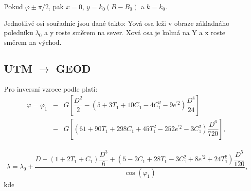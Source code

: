 \documentclass[11pt,a4paper]{article}
\begin{document}
Pokud $\varphi \pm \pi/2$, pak $x=0$, $y = k_{0}\left(B-B_{0}\right)$ a $k=k_{0}$.

Jednotlivé osi souřadníc jsou dané takto: Yová osa leži v obraze základnáho poledníku $\lambda_{0}$ a y roste směrem na sever. Xová osa je kolmá na Y a x roste směrem na východ. 

\subsection{UTM $\rightarrow$ GEOD}

Pro inversní vzroce podle \cite{Snyder1987}  platí:
\begin{eqnarray}
\varphi = \varphi_{1} &-& G\left[\dfrac{D^{2}}{2}-\left(5+3T_{1}+10C_{1}-4C_{1}^{2}-9e^{'2}\right)\dfrac{D^{4}}{24}\right] \\ \nonumber
                      &-& G\left[\left(61+90T_{1}+298C_{1}+45T_{1}^{2}-252e^{'2}-3C_{1}^{2}\right)\dfrac{D^{6}}{720}\right], 
                      \label{rov:invPhi}
\end{eqnarray}

\begin{eqnarray}
\lambda = \lambda_{0} + \dfrac{D-\left(1+2T_{1}+C_{1}\right)\dfrac{D^{3}}{6} + \left(5-2C_{1}+28T_{1}-3C_{1}^{2}+8e^{'2} + 24T_{1}^{2}\right)\dfrac{D^{5}}{120}}{\cos{\left(\varphi_{1}\right)}},
\label{rov:invLam}
\end{eqnarray}
kde
\end{document}
